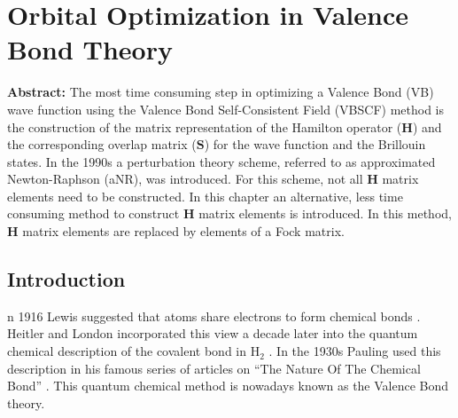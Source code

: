 \chapter{Orbital Optimization in Valence Bond Theory}
\label{chap_orbopt}


\noindent\textbf{Abstract:} The most time consuming step in optimizing a Valence Bond (VB) wave function using the Valence Bond Self-Consistent Field (VBSCF) method is the construction of the matrix representation of the Hamilton operator ($\mathbf{H}$) and the corresponding overlap matrix ($\mathbf{S}$) for the wave function and the Brillouin states. In the 1990s a perturbation theory scheme, referred to as approximated Newton-Raphson (aNR), was introduced. For this scheme, not all $\mathbf{H}$ matrix elements need to be constructed. In this chapter an alternative, less time consuming method  to construct $\mathbf{H}$ matrix elements is introduced. In this method, $\mathbf{H}$ matrix elements are replaced by elements of a Fock matrix.

\newpage

\section{Introduction}

\lettrine{}{}n 1916 Lewis suggested that atoms share electrons to form chemical bonds \cite{lewis}. Heitler and London incorporated this view a decade later into the quantum chemical description of the covalent bond in H$_2$ \cite{heitler}. In the 1930s Pauling used this description in his famous series of articles on ``The Nature Of The Chemical Bond'' \cite{pauling1,pauling2,pauling3,pauling4,pauling5,pauling6,pauling7,paulingbook}. This quantum chemical method is nowadays known as the Valence Bond theory.

